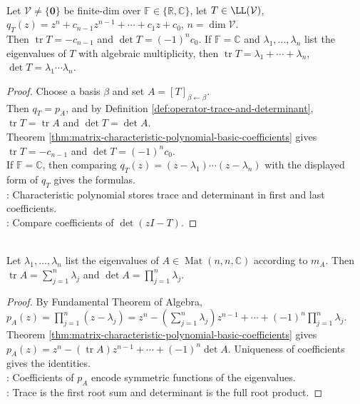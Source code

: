 \begin{proposition} \label{prop:operator-trace-determinant-characteristic-coefficients} \\
Let $\mathcal{V}\neq\{\mathbf{0}\}$ be finite-dim over $\mathbb{F}\in\{\mathbb{R},\mathbb{C}\}$, let $T\in\LL(\mathcal{V})$, $q_T(z)=z^n+c_{n-1}z^{n-1}+\cdots+c_1z+c_0$, $n=\dim\mathcal{V}$.\\
Then $\operatorname{tr}T=-c_{n-1}$ and $\det T=(-1)^nc_0$. If $\mathbb{F}=\mathbb{C}$ and $\lambda_1,\ldots,\lambda_n$ list the eigenvalues of $T$ with algebraic multiplicity, then $\operatorname{tr}T=\lambda_1+\cdots+\lambda_n$, $\det T=\lambda_1\cdots\lambda_n$.
\begin{proof}
Choose a basis $\beta$ and set $A=[T]_{\beta\leftarrow\beta}$.\\
Then $q_T=p_A$, and by Definition \ref{def:operator-trace-and-determinant}, $\operatorname{tr}T=\operatorname{tr}A$ and $\det T=\det A$.\\
Theorem \ref{thm:matrix-characteristic-polynomial-basic-coefficients} gives $\operatorname{tr}T=-c_{n-1}$ and $\det T=(-1)^nc_0$.\\
If $\mathbb{F}=\mathbb{C}$, then comparing $q_T(z)=(z-\lambda_1)\cdots(z-\lambda_n)$ with the displayed form of $q_T$ gives the formulas.\\
: Characteristic polynomial stores trace and determinant in first and last coefficients.\\
: Compare coefficients of $\det(zI-T)$.
\end{proof}
\end{proposition}

\begin{proposition} \label{prop:trace-determinant-from-eigenvalues} \\
Let $\lambda_1,\ldots,\lambda_n$ list the eigenvalues of $A\in\operatorname{Mat}(n,n,\mathbb{C})$ according to $m_A$. Then $\operatorname{tr}A=\sum\limits_{j=1}^{n}\lambda_j$ and $\det A=\prod\limits_{j=1}^{n}\lambda_j$.
\begin{proof}
By Fundamental Theorem of Algebra, $p_A(z)=\prod\limits_{j=1}^{n}(z-\lambda_j) =z^n-\left(\sum\limits_{j=1}^{n}\lambda_j\right)z^{n-1}+\cdots+(-1)^n\prod\limits_{j=1}^{n}\lambda_j$.\\
Theorem \ref{thm:matrix-characteristic-polynomial-basic-coefficients} gives $p_A(z)=z^n-(\operatorname{tr}A)z^{n-1}+\cdots+(-1)^n\det A$. Uniqueness of coefficients gives the identities.\\
: Coefficients of $p_A$ encode symmetric functions of the eigenvalues.\\
: Trace is the first root sum and determinant is the full root product.
\end{proof}
\end{proposition}

